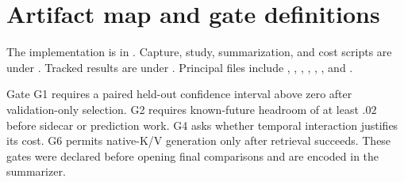 \documentclass[11pt]{article}
\begin{document}
\appendix
\section{Artifact map and gate definitions}
The implementation is in . Capture, study, summarization, and cost scripts are under . Tracked results are under . Principal files include , , , , , , and .

Gate G1 requires a paired held-out confidence interval above zero after validation-only selection. G2 requires known-future headroom of at least $.02$ before sidecar or prediction work. G4 asks whether temporal interaction justifies its cost. G6 permits native-K/V generation only after retrieval succeeds. These gates were declared before opening final comparisons and are encoded in the summarizer.



\end{document}

